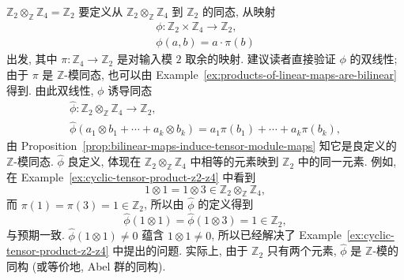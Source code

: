 \begin{Example}{$\mathbb{Z}_{2}\otimes_{\mathbb{Z}}\mathbb{Z}_{4}=\mathbb{Z}_{2}$}\leavevmode\label{ex:cyclic-tensor-product-is-z2}
要定义从 $\mathbb{Z}_{2}\otimes_{\mathbb{Z}}\mathbb{Z}_{4}$ 到 $\mathbb{Z}_{2}$ 的同态, 从映射
\[
  \begin{gathered}
    \phi:\mathbb{Z}_{2}\times\mathbb{Z}_{4}\to\mathbb{Z}_{2},\\
    \phi(a,b)=a\cdot\pi(b)
  \end{gathered}
\]
出发, 其中 $\pi:\mathbb{Z}_{4}\to\mathbb{Z}_{2}$ 是对输入模 $2$ 取余的映射. 建议读者直接验证 $\phi$ 的双线性; 由于 $\pi$ 是 $\mathbb{Z}$-模同态, 也可以由 Example~\ref{ex:products-of-linear-maps-are-bilinear} 得到. 由此双线性, $\phi$ 诱导同态
\[
  \begin{gathered}
    \widehat{\phi}:\mathbb{Z}_{2}\otimes_{\mathbb{Z}}\mathbb{Z}_{4}\to\mathbb{Z}_{2},\\
    \widehat{\phi}(a_{1}\otimes b_{1}+\cdots+a_{k}\otimes b_{k})
      =a_{1}\pi(b_{1})+\cdots+a_{k}\pi(b_{k}),
  \end{gathered}
\]
由 Proposition~\ref{prop:bilinear-maps-induce-tensor-module-maps} 知它是良定义的 $\mathbb{Z}$-模同态. $\widehat{\phi}$ 良定义, 体现在 $\mathbb{Z}_{2}\otimes_{\mathbb{Z}}\mathbb{Z}_{4}$ 中相等的元素映到 $\mathbb{Z}_{2}$ 中的同一元素. 例如, 在 Example~\ref{ex:cyclic-tensor-product-z2-z4} 中看到
\[
  1\otimes1=1\otimes3\in\mathbb{Z}_{2}\otimes_{\mathbb{Z}}\mathbb{Z}_{4},
\]
而 $\pi(1)=\pi(3)=1\in\mathbb{Z}_{2}$, 所以由 $\widehat{\phi}$ 的定义得到
\[
  \widehat{\phi}(1\otimes1)=\widehat{\phi}(1\otimes3)=1\in\mathbb{Z}_{2},
\]
与预期一致. $\widehat{\phi}(1\otimes1)\neq0$ 蕴含 $1\otimes1\neq0$, 所以已经解决了 Example~\ref{ex:cyclic-tensor-product-z2-z4} 中提出的问题. 实际上, 由于 $\mathbb{Z}_{2}$ 只有两个元素, $\widehat{\phi}$ 是 $\mathbb{Z}$-模的同构 (或等价地, Abel 群的同构).
\end{Example}

